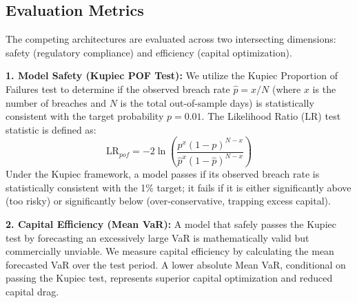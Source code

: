\subsection{Evaluation Metrics}
The competing architectures are evaluated across two intersecting dimensions: safety (regulatory compliance) and efficiency (capital optimization).

\textbf{1. Model Safety (Kupiec POF Test):} 
We utilize the Kupiec Proportion of Failures test \cite{kupiec1995techniques} to determine if the observed breach rate $\hat{p} = x / N$ (where $x$ is the number of breaches and $N$ is the total out-of-sample days) is statistically consistent with the target probability $p = 0.01$. The Likelihood Ratio (LR) test statistic is defined as:
\begin{equation}
    \text{LR}_{pof} = -2 \ln \left( \frac{p^x (1-p)^{N-x}}{\hat{p}^x (1-\hat{p})^{N-x}} \right)
\end{equation}
Under the Kupiec framework, a model passes if its observed breach rate is statistically consistent with the 1\% target; it fails if it is either significantly above (too risky) or significantly below (over-conservative, trapping excess capital).

\textbf{2. Capital Efficiency (Mean VaR):}
A model that safely passes the Kupiec test by forecasting an excessively large VaR is mathematically valid but commercially unviable. We measure capital efficiency by calculating the mean forecasted VaR over the test period. A lower absolute Mean VaR, conditional on passing the Kupiec test, represents superior capital optimization and reduced capital drag.


